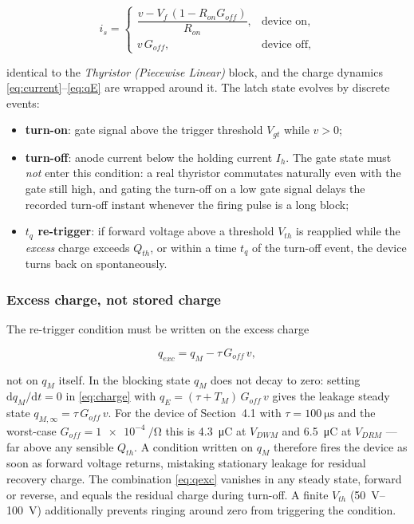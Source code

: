 \documentclass[11pt,a4paper]{article}
\begin{document}
\begin{equation}
  i_s =
  \begin{cases}
    \dfrac{v - V_f\,(1 - R_{on} G_{off})}{R_{on}}, & \text{device on},\\[2ex]
    v\, G_{off}, & \text{device off},
  \end{cases}
  \label{eq:pwl}
\end{equation}

identical to the \emph{Thyristor (Piecewise Linear)} block, and the charge
dynamics \eqref{eq:current}--\eqref{eq:qE} are wrapped around it. The latch
state evolves by discrete events:

\begin{itemize}
  \item \textbf{turn-on}: gate signal above the trigger threshold $V_{gt}$
        while $v > 0$;
  \item \textbf{turn-off}: anode current below the holding current $I_h$.
        The gate state must \emph{not} enter this condition: a real
        thyristor commutates naturally even with the gate still high, and
        gating the turn-off on a low gate signal delays the recorded
        turn-off instant whenever the firing pulse is a long block;
  \item \textbf{$t_q$ re-trigger}: if forward voltage above a threshold
        $V_{th}$ is reapplied while the \emph{excess} charge exceeds
        $Q_{th}$, or within a time $t_q$ of the turn-off event, the device
        turns back on spontaneously.
\end{itemize}

\subsubsection*{Excess charge, not stored charge}

The re-trigger condition must be written on the excess charge

\begin{equation}
  q_{exc} = q_M - \tau\, G_{off}\, v,
  \label{eq:qexc}
\end{equation}

not on $q_M$ itself. In the blocking state $q_M$ does not decay to zero:
setting $\mathrm{d}q_M/\mathrm{d}t = 0$ in \eqref{eq:charge} with
$q_E = (\tau+T_M)\,G_{off}\,v$ gives the leakage steady state
$q_{M,\infty} = \tau\,G_{off}\,v$. For the device of Section~4.1 with
$\tau = \SI{100}{\micro\second}$ and the worst-case
$G_{off} = \SI{1e-4}{\per\ohm}$ this is \SI{4.3}{\micro\coulomb} at
$V_{DWM}$ and \SI{6.5}{\micro\coulomb} at $V_{DRM}$ --- far above any
sensible $Q_{th}$. A condition written on $q_M$ therefore fires the device
as soon as forward voltage returns, mistaking stationary leakage for
residual recovery charge. The combination \eqref{eq:qexc} vanishes in any
steady state, forward or reverse, and equals the residual charge during
turn-off. A finite $V_{th}$ (\SIrange{50}{100}{\volt}) additionally
prevents ringing around zero from triggering the condition.
\end{document}
